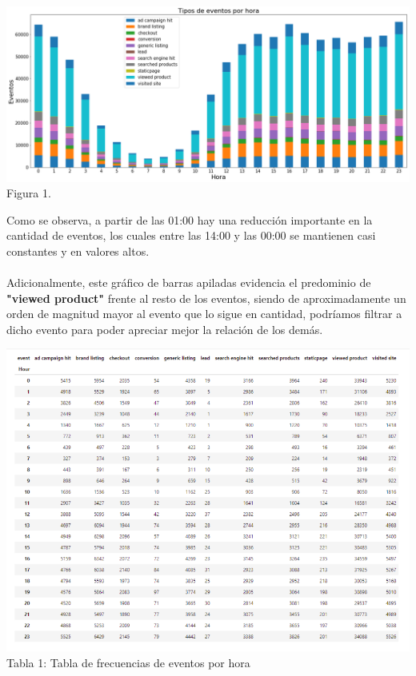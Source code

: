 \documentclass[a4paper ,12pt]{article}
\begin{document}
\begin{center}
\includegraphics[width=1.1\linewidth]{output_12_1}
Figura 1.
\end{center}
	

Como se observa, a partir de las 01:00 hay una reducción importante en la cantidad de eventos, los cuales entre las 14:00 y las 00:00 se mantienen casi constantes y en valores altos.\\
 
  \\


Adicionalmente, este gráfico de barras apiladas evidencia el predominio de \textbf{"viewed product"} frente al resto de los eventos, siendo de aproximadamente un orden de magnitud mayor al evento que lo sigue en cantidad, podríamos filtrar a dicho evento para poder apreciar mejor la relación de los demás.\\

\begin{center}
	\includegraphics[width=1.1\linewidth]{table_1}
	Tabla 1: Tabla de frecuencias de eventos por hora

\end{center}
\end{document}
